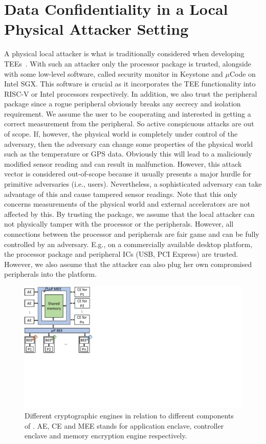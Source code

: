 
\section{Data Confidentiality in a Local Physical Attacker Setting}

A physical local attacker is what is traditionally considered when developing TEEs~\cite{costan2016intel,keystone}. With such an attacker only the processor package is trusted, alongside with some low-level software, called security monitor in Keystone and $\mu$Code on Intel SGX. This software is crucial as it incorporates the TEE functionality into RISC-V or Intel processors respectively. In addition, we also trust the peripheral package since a rogue peripheral obviously breaks any secrecy and isolation requirement. We assume the user to be cooperating and interested in getting a correct measurement from the peripheral. So active conspicuous attacks are out of scope.  If, however, the physical world is completely under control of the adversary, then the adversary can change some properties of the physical world such as the temperature or GPS data. Obviously this will lead to a maliciously modified sensor reading and can result in malfunction. However, this attack vector is considered out-of-scope because it usually presents a major hurdle for primitive adversaries (i.e., users). Nevertheless, a sophisticated adversary can take advantage of this and cause tampered sensor readings. Note that this only concerns measurements of the physical world and external accelerators are not affected by this. By trusting the package, we assume that the local attacker can not physically tamper with the processor or the peripherals. However, all connections between the processor and peripherals are fair game and can be fully controlled by an adversary. E.g., on a commercially available desktop platform, the processor package and peripheral ICs (USB, PCI Express) are trusted. However, we also assume that the attacker can also plug her own compromised peripherals into the platform. 



  \begin{figure}[tbp]
   \centering
   \includegraphics[trim={0 8.5cm 23cm 0}, clip, width=0.5\linewidth]{chapters/PIE/images/memoryEnc.pdf}
   \caption{Different cryptographic engines in relation to different components of \name. AE, CE and MEE stands for application enclave, controller enclave and memory encryption engine respectively.}
   \label{fig:encEngine}
  \end{figure}

